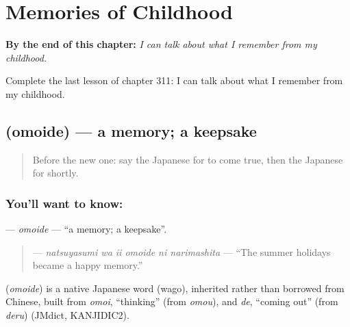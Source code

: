 
\chapter{Memories of Childhood}
\label{ch:ja-memories-of-childhood}

\begin{chapteropening}
\textbf{By the end of this chapter:} \emph{I can talk about what I remember from my childhood.}

Complete the last lesson of chapter 311: I can talk about what I remember from my childhood.
\end{chapteropening}

\section[\texorpdfstring{\ja{おもいで} (omoide)}{おもいで (omoide)}]{ (omoide) — a memory; a keepsake}

\label{lesson:JA-C311-omoide}



\begin{quote}
Before the new one: say the Japanese for to come true, then the Japanese for shortly.
\end{quote}

\subsection*{You'll want to know: }
\textbf{} — \emph{omoide} — \textquotedblleft{}a memory; a keepsake\textquotedblright{}.

\begin{quote}
\textbf{   } — \emph{natsuyasumi wa ii omoide ni narimashita} — \textquotedblleft{}The summer holidays became a happy memory.\textquotedblright{}
\end{quote}

\begin{cousinweb}
\textbf{} (\emph{omoide}) is a native Japanese word (wago), inherited rather than borrowed from Chinese, built from \emph{omoi}, \textquotedblleft{}thinking\textquotedblright{} (from \emph{omou}), and \emph{de}, \textquotedblleft{}coming out\textquotedblright{} (from \emph{deru}) (JMdict, KANJIDIC2).
\end{cousinweb}

